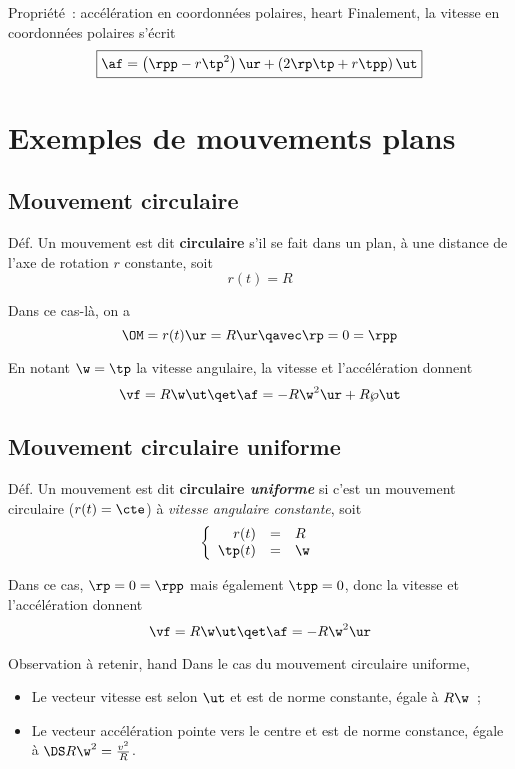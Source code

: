 \documentclass[../main/main.tex]{subfiles}
\begin{document}

\begin{tprop}{Propriété~: accélération en coordonnées polaires, heart}
	Finalement, la vitesse en coordonnées polaires s'écrit
	\[\boxed{\af = \left( \rpp -r\tp^2 \right)\ur + \left( 2\rp\tp+r\tpp
			\right)\ut}\]
\end{tprop}

\section{Exemples de mouvements plans}
\subsection{Mouvement circulaire}

\begin{rdefi}{Déf.}
	Un mouvement est dit \textbf{circulaire} s'il se fait dans un plan, à une
	distance de l'axe de rotation $r$ constante, soit
	\[
		r(t) = R
	\]
\end{rdefi}

Dans ce cas-là, on a
\[
	\OM = r(t)\ur = R\ur
	\qavec
	\rp = 0 = \rpp
\]

En notant $\w = \tp$ la vitesse angulaire, la vitesse et l'accélération donnent
\[
	\vf = R\w\ut
	\qet
	\af = -R\w^2\ur + R\wp\ut
\]

\subsection{Mouvement circulaire uniforme}
\begin{rdefi}{Déf.}
	Un mouvement est dit \textbf{circulaire \textit{uniforme}} si c'est un
	mouvement circulaire ($r(t) = \cte$) à \textit{vitesse angulaire
		constante}, soit
	\[
		\left\{
		\begin{array}{rcl}
			r(t)   & = & R  \\
			\tp(t) & = & \w
		\end{array}
		\right.
	\]
\end{rdefi}

Dans ce cas, $\rp = 0 = \rpp$ mais également $\tpp = 0$, donc la vitesse et
l'accélération donnent
\[
	\vf = R\w\ut
	\qet
	\af = -R\w^2\ur
\]

\begin{tror}{Observation à retenir, hand}
	Dans le cas du mouvement circulaire uniforme,
	\begin{itemize}
		\item Le vecteur vitesse est selon $\ut$ et est de norme constante,
		      égale à $R\w$~;
		\item Le vecteur accélération pointe vers le centre et est de norme
		      constance, égale à $\DS R\w^2 = \frac{v^2}{R}$.
	\end{itemize}
\end{tror}
\end{document}
